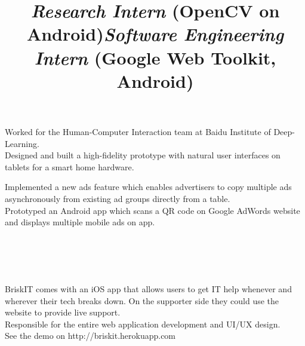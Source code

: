 \begin{resume}
\title{\textsl{Research Intern} (OpenCV on Android)}
\begin{position}
Worked for the Human-Computer Interaction team at Baidu Institute of Deep-Learning. \\
Designed and built a high-fidelity prototype with natural user interfaces on tablets for a smart home hardware.
\end{position}

\title{\textsl{Software Engineering Intern} (Google Web Toolkit, Android)}
\begin{position}
Implemented a new ads feature which enables advertisers to copy multiple ads asynchronously from existing ad groups directly from a table.\\
Prototyped an Android app which scans a QR code on Google AdWords website and displays multiple mobile ads on app.

\end{position}




\begin{formatb}
  \\
  \body\\
\end{formatb}

\section{}

\begin{position}
BriskIT comes with an iOS app that allows users to get IT help whenever and wherever their tech breaks down. On the supporter side they could use the website to provide live support. \\
Responsible for the entire web application development and UI/UX design. \\
See the demo on http://briskit.herokuapp.com
\end{position}


\end{resume}

